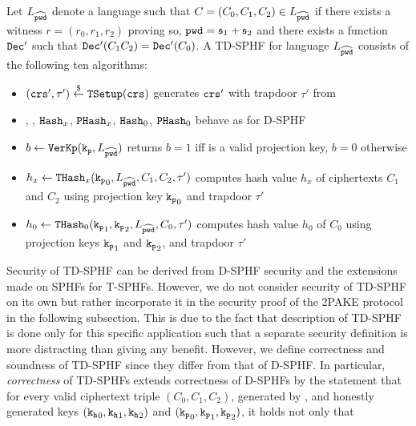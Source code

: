 \begin{definition}[TD-SPHF]\label{def:tdsphf}
Let $L_{\widehat{\mathtt{pwd}}}$ denote a language such that $C=(C_0,C_1,C_2)\in L_{\widehat{\mathtt{pwd}}}$ if there exists a witness $r=(r_0,r_1,r_2)$ proving so, $\mathtt{pwd}=\mathfrak{s}_1+\mathfrak{s}_2$ and there exists a function $\mathtt{Dec}'$ such that $\mathtt{Dec}'(C_1 C_2)=\mathtt{Dec}'(C_0)$.
A \ac{TD-SPHF} for language $L_{\widehat{\mathtt{pwd}}}$ consists of the following ten algorithms:

\begin{itemize}
	\item $(\mathtt{crs}',\tau')\stackrel{\$}{\gets}\mathtt{TSetup}(\mathtt{crs})$ generates $\mathtt{crs}'$ with trapdoor $\tau'$ from \crs

	\item \HKGen, \PKGen, $\mathtt{Hash}_x$, $\mathtt{PHash}_x$, $\mathtt{Hash}_0$, $\mathtt{PHash}_0$ behave as for \ac{D-SPHF}
	
	\item $b\gets\mathtt{VerKp}(\mathtt{k_p},L_{\widehat{\mathtt{pwd}}})$ returns $b=1$ iff \hp is a valid projection key, $b=0$ otherwise
	
	\item $h_x\gets\mathtt{THash}_x(\mathtt{k_p}_0,L_{\widehat{\mathtt{pwd}}},C_1,C_2,\tau')$ computes hash value $h_x$ of ciphertexts $C_1$ and $C_2$ using projection key $\mathtt{k_p}_0$ and trapdoor $\tau'$
	
	\item $h_0\gets\mathtt{THash}_0(\mathtt{k_p}_1,\mathtt{k_p}_2,L_{\widehat{\mathtt{pwd}}},C_0,\tau')$ computes hash value $h_0$ of $C_0$ using projection keys $\mathtt{k_p}_1$ and $\mathtt{k_p}_2$, and trapdoor $\tau'$
\end{itemize}
\end{definition}


\noindent
Security of \ac{TD-SPHF} can be derived from \ac{D-SPHF} security and the extensions made on \acp{SPHF} for \acp{T-SPHF}.
However, we do not consider security of \ac{TD-SPHF} on its own but rather incorporate it in the security proof of the \ac{2PAKE} protocol in the following subsection.
This is due to the fact that description of \ac{TD-SPHF} is done only for this specific application such that a separate security definition is more distracting than giving any benefit.
However, we define correctness and soundness of \ac{TD-SPHF} since they differ from that of \ac{D-SPHF}.
In particular, \emph{correctness} of TD-SPHFs extends correctness of D-SPHFs by the statement that for every  valid ciphertext triple $(C_0,C_1,C_2)$, generated by \cL, and honestly generated keys $(\mathtt{k_h}_0,\mathtt{k_h}_1,\mathtt{k_h}_2)$ and $(\mathtt{k_p}_0,\mathtt{k_p}_1,\mathtt{k_p}_2)$, it holds not only that 

